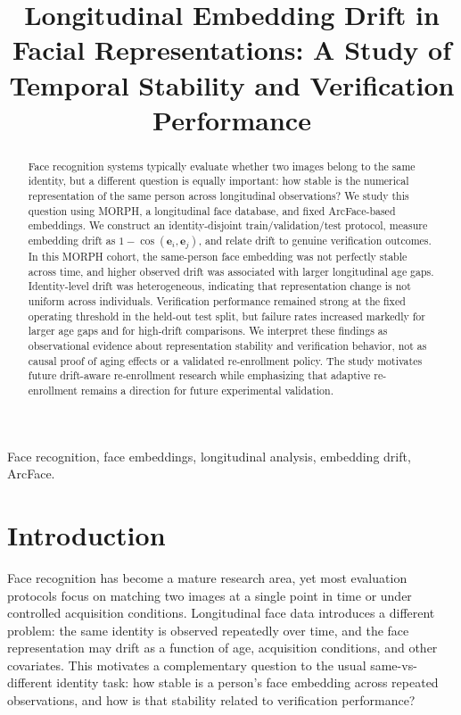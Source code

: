 \documentclass[conference]{IEEEtran}
\title{Longitudinal Embedding Drift in Facial Representations: A Study of Temporal Stability and Verification Performance}
\author{
\IEEEauthorblockN{Harshinder Singh\IEEEauthorrefmark{1},\
Gyan Sharma\IEEEauthorrefmark{1},\
Devansh Goel\IEEEauthorrefmark{1},\
Siddhant Nirwal\IEEEauthorrefmark{1}}
\IEEEauthorblockA{\IEEEauthorrefmark{1}Department of Computer Science and Engineering\
ABES Institute of Technology\
Ghaziabad, India}
}
\begin{document}
\maketitle

\begin{abstract}
Face recognition systems typically evaluate whether two images belong to the same identity, but a different question is equally important: how stable is the numerical representation of the same person across longitudinal observations? We study this question using MORPH, a longitudinal face database, and fixed ArcFace-based embeddings. We construct an identity-disjoint train/validation/test protocol, measure embedding drift as $1 - \cos(\mathbf{e}_i, \mathbf{e}_j)$, and relate drift to genuine verification outcomes. In this MORPH cohort, the same-person face embedding was not perfectly stable across time, and higher observed drift was associated with larger longitudinal age gaps. Identity-level drift was heterogeneous, indicating that representation change is not uniform across individuals. Verification performance remained strong at the fixed operating threshold in the held-out test split, but failure rates increased markedly for larger age gaps and for high-drift comparisons. We interpret these findings as observational evidence about representation stability and verification behavior, not as causal proof of aging effects or a validated re-enrollment policy. The study motivates future drift-aware re-enrollment research while emphasizing that adaptive re-enrollment remains a direction for future experimental validation.
\end{abstract}

\begin{IEEEkeywords}
Face recognition, face embeddings, longitudinal analysis, embedding drift, ArcFace.
\end{IEEEkeywords}

\section{Introduction}
\label{sec:introduction}
Face recognition has become a mature research area, yet most evaluation protocols focus on matching two images at a single point in time or under controlled acquisition conditions. Longitudinal face data introduces a different problem: the same identity is observed repeatedly over time, and the face representation may drift as a function of age, acquisition conditions, and other covariates. This motivates a complementary question to the usual same-vs-different identity task: how stable is a person's face embedding across repeated observations, and how is that stability related to verification performance?
\end{document}
